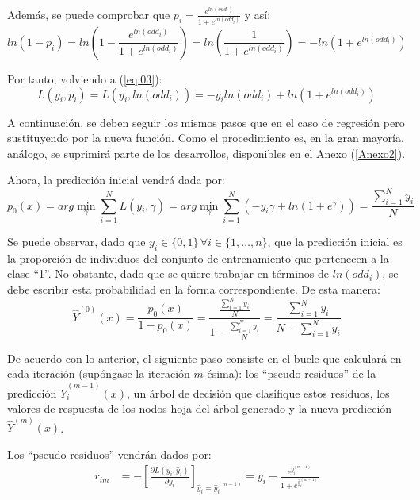 \documentclass[12pt,twoside]{article}
\begin{document}
Además, se puede comprobar que $p_i = \frac{e^{ln(odd_i)}}{1 + e^{ln(odd_i)}}$ y así:
\begin{equation*}
ln(1-p_i) = ln \left( 1- \frac{e^{ln(odd_i)}}{1 + e^{ln(odd_i)}} \right) = ln \left( \frac{1}{1 + e^{ln(odd_i)}} \right) = - ln \left( 1 + e^{ln(odd_i)} \right)
\end{equation*}

Por tanto, volviendo a (\ref{eq:03}):
\begin{equation*}
L(y_i, p_i) = L(y_i, ln(odd_i)) = -y_i ln(odd_i) + ln \left( 1 + e^{ln(odd_i)} \right)
\end{equation*}

A continuación, se deben seguir los mismos pasos que en el caso de regresión pero sustituyendo por la nueva función. Como el procedimiento es, en la gran mayoría, análogo, se suprimirá parte de los desarrollos, disponibles en el Anexo (\ref{Anexo2}). 

Ahora, la predicción inicial vendrá dada por:
\begin{equation}
\label{eqn:1}
p_0(x) = arg\min_{\gamma} \sum_{i=1}^N L(y_i, \gamma) = arg\min_{\gamma} \sum_{i=1}^N \left( -y_i \gamma + ln \left( 1 + e^{\gamma} \right) \right) = \frac{\sum_{i=1}^{N} y_i}{N} 
\end{equation}

Se puede observar, dado que $y_i \in \{0, 1 \} \, \forall i \in \{1, \dots, n \}$, que la predicción inicial es la proporción de individuos del conjunto de entrenamiento que pertenecen a la clase ``1''. No obstante, dado que se quiere trabajar en términos de $ln(odd_i)$, se debe escribir esta probabilidad en la forma correspondiente. De esta manera:
\begin{equation*}
\hat{Y}^{(0)}(x) = \frac{p_0(x)}{1-p_0(x)} = \frac{\frac{\sum_{i=1}^{N} y_i}{N}}{1 - \frac{\sum_{i=1}^{N} y_i}{N}} = \frac{\sum_{i=1}^{N} y_i}{N -\sum_{i=1}^{N} y_i}
\end{equation*}

De acuerdo con lo anterior, el siguiente paso consiste en el bucle que calculará en cada iteración (supóngase la iteración $m$-ésima): los ``pseudo-residuos'' de la predicción $\hat{Y}_i^{(m-1)}(x)$, un árbol de decisión que clasifique estos residuos, los valores de respuesta de los nodos hoja del árbol generado y la nueva predicción $\hat{Y}^{(m)}(x)$.

Los ``pseudo-residuos'' vendrán dados por:
\begin{equation}
\label{eqn:2}
\begin{split}
r_{im} &= -\left[ \frac{\partial L(y_i, \hat{y}_i)}{\partial \hat{y}_i} \right]_{\hat{y}_i=\hat{y}_i^{(m-1)}} =  y_i - \frac{e^{\hat{y}_i^{(m-1)}}}{1 + e^{\hat{y}_i^{(m-1)}}}
\end{split}
\end{equation}
\end{document}
